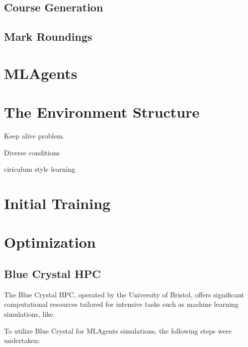 


\subsection{Course Generation}

\subsection{Mark Roundings}

\section{MLAgents}

\section{The Environment Structure}
Keep alive problem.

Diverse conditions

ciriculum style learning

\section{Initial Training}

\section{Optimization}

\subsection{Blue Crystal HPC}

The Blue Crystal HPC, operated by the University of Bristol, offers significant computational resources tailored for intensive tasks such as machine learning simulations, like.


To utilize Blue Crystal for MLAgents simulations, the following steps were undertaken:

